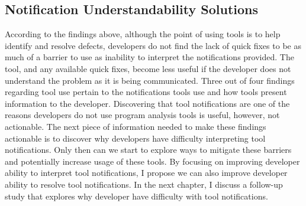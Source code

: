 \subsection{Notification Understandability Solutions}
According to the findings above, although the point of using tools is to help identify and resolve defects, developers do not find the lack of quick fixes to be as much of a barrier to use as inability to interpret the notifications provided.
The tool, and any available quick fixes, become less useful if the developer does not understand the problem as it is being communicated.
Three out of four findings regarding tool use pertain to the notifications tools use and how tools present information to the developer.
Discovering that tool notifications are one of the reasons developers do not use program analysis tools is useful, however, not actionable. The next piece of information needed to make these findings actionable is to discover why developers have difficulty interpreting tool notifications. Only then can we start to explore ways to mitigate these barriers and potentially increase usage of these tools.
By focusing on improving developer ability to interpret tool notifications, I propose we can also improve developer ability to resolve tool notifications. In the next chapter, I discuss a follow-up study that explores why developer have difficulty with tool notifications.
